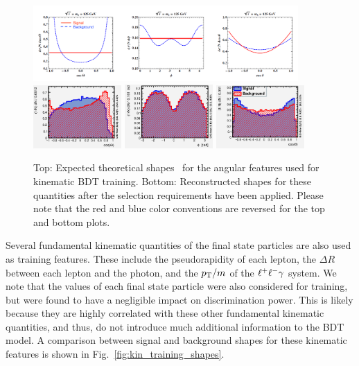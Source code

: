 \begin{figure}[tb]
	\begin{center}
		\includegraphics[width=0.9\textwidth]{fig/MVA/Zg_theorist.png}
		\includegraphics[width=0.3\textwidth]{fig/MVA/cosTheta_reco.png}
		\includegraphics[width=0.3\textwidth]{fig/MVA/phi_reco.png}
		\includegraphics[width=0.3\textwidth]{fig/MVA/costheta_reco.png}
	\end{center}
	\caption[Top: Expected theoretical shapees for the angular features used for kinematic BDT training. Bottom: Reconstructed shapes for these quantities after the \hzg{} selection requirements have been applied. Please note that the red and blue color conventions are reversed for the top and bottom plots.]
	{Top: Expected theoretical shapes~\cite{HZg_angle1} for the angular features used for kinematic BDT training. Bottom: Reconstructed shapes for these quantities after the \hzg{} selection requirements have been applied. Please note that the red and blue color conventions are reversed for the top and bottom plots.} \label{fig:kin_GEN_angles}
\end{figure}

Several fundamental kinematic quantities of the final state particles are also used as training features. These include the pseudorapidity of each lepton, the $\Delta R$ between each lepton and the photon, and the $p_{\mathrm{T}}/m$ of the $\ell^{+}\ell^{-}\gamma$ system. We note that the \pt values of each final state particle were also considered for training, but were found to have a negligible impact on discrimination power. This is likely because they are highly correlated with these other fundamental kinematic quantities, and thus, do not introduce much additional information to the BDT model. A comparison between signal and background shapes for these kinematic features is shown in Fig.~\ref{fig:kin_training_shapes}.

